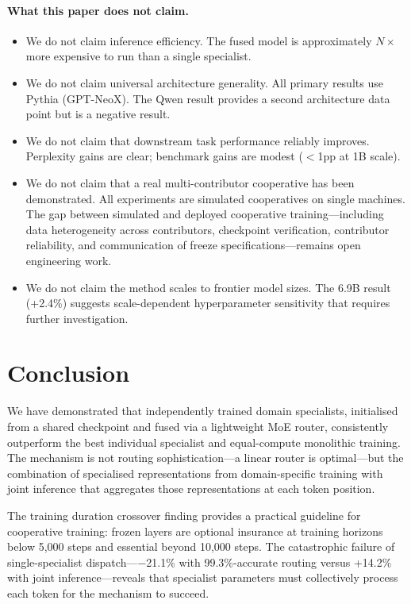 \documentclass{article}
\begin{document}
\paragraph{What this paper does not claim.}
\begin{itemize}[leftmargin=*, itemsep=1pt]
  \item We do not claim inference efficiency. The fused model is approximately $N\times$ more expensive to run than a single specialist.
  \item We do not claim universal architecture generality. All primary results use Pythia (GPT-NeoX). The Qwen result provides a second architecture data point but is a negative result.
  \item We do not claim that downstream task performance reliably improves. Perplexity gains are clear; benchmark gains are modest ($<$1pp at 1B scale).
  \item We do not claim that a real multi-contributor cooperative has been demonstrated. All experiments are simulated cooperatives on single machines. The gap between simulated and deployed cooperative training---including data heterogeneity across contributors, checkpoint verification, contributor reliability, and communication of freeze specifications---remains open engineering work.
  \item We do not claim the method scales to frontier model sizes. The 6.9B result (+2.4\%) suggests scale-dependent hyperparameter sensitivity that requires further investigation.
\end{itemize}

\section{Conclusion}
\label{sec:conclusion}

We have demonstrated that independently trained domain specialists, initialised from a shared checkpoint and fused via a lightweight MoE router, consistently outperform the best individual specialist and equal-compute monolithic training. The mechanism is not routing sophistication---a linear router is optimal---but the combination of specialised representations from domain-specific training with joint inference that aggregates those representations at each token position.

The training duration crossover finding provides a practical guideline for cooperative training: frozen layers are optional insurance at training horizons below 5,000 steps and essential beyond 10,000 steps. The catastrophic failure of single-specialist dispatch---$-$21.1\% with 99.3\%-accurate routing versus +14.2\% with joint inference---reveals that specialist parameters must collectively process each token for the mechanism to succeed.
\end{document}
